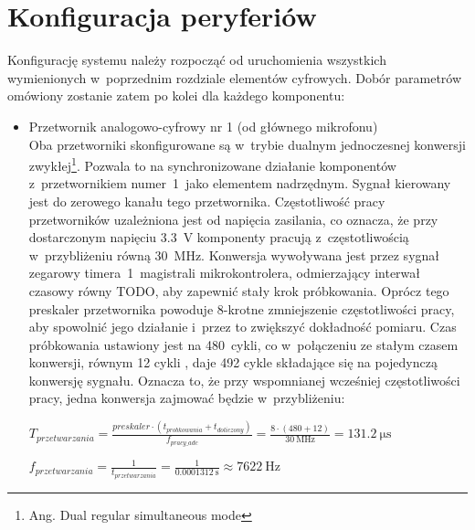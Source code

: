 \section{Konfiguracja peryferiów}
Konfigurację systemu należy rozpocząć od uruchomienia wszystkich wymienionych w~poprzednim rozdziale elementów cyfrowych. Dobór parametrów omówiony zostanie zatem po kolei dla każdego komponentu:
\begin{itemize}
	\item Przetwornik analogowo-cyfrowy nr 1 (od głównego mikrofonu)\\
	Oba przetworniki skonfigurowane są w~trybie dualnym jednoczesnej konwersji zwykłej\footnote{Ang. Dual regular simultaneous mode}. Pozwala to na synchronizowane działanie komponentów z~przetwornikiem numer~1~jako elementem nadrzędnym. Sygnał kierowany jest do zerowego kanału tego przetwornika. Częstotliwość pracy przetworników uzależniona jest od napięcia zasilania, co oznacza, że przy dostarczonym napięciu \SI{3.3}{\V} komponenty pracują z~częstotliwością w~przybliżeniu równą \SI{30}{\MHz}. Konwersja wywoływana jest przez sygnał zegarowy timera~1~magistrali mikrokontrolera, odmierzający interwał czasowy równy TODO, %
	aby zapewnić stały krok próbkowania. Oprócz tego preskaler przetwornika powoduje 8-krotne zmniejszenie częstotliwości pracy, aby spowolnić jego działanie i~przez to zwiększyć dokładność pomiaru. Czas próbkowania ustawiony jest na 480~cykli, co w~połączeniu ze stałym czasem konwersji, równym 12 cykli \cite{RM0390}, daje 492 cykle składające się na pojedynczą konwersję sygnału. Oznacza to, że przy wspomnianej wcześniej częstotliwości pracy, jedna konwersja zajmować będzie w~przybliżeniu:
		
\begin{center}
		$ T_{przetwarzania} = \frac{preskaler \cdot (t_{probkowania} + t_{doliczony})}{f_{pracy\_adc}} = \frac{8\cdot(480+12)}{\SI{30}{\MHz}} = \SI{131,2}{\micro\s} $
	
	$ f_{przetwarzania} = \frac{1}{t_{przetwarzania}} = \frac{1}{\SI{0.0001312}{\s}} \approx \SI{7622}{\Hz} $ 
	

\end{center}
\end{itemize}
